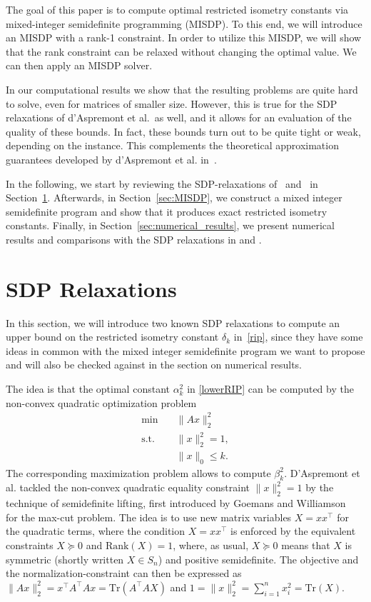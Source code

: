 \documentclass[journal]{IEEEtran}
\newcommand{\Norm}[2]{\lVert{#1}\rVert_{#2}}
\newcommand{\T}{^{\top}}
\newcommand{\Tr}{\text{Tr}}
\newcommand{\Rk}{\text{Rank}}
\begin{document}
The goal of this paper is to compute optimal restricted isometry constants
via mixed-integer semidefinite programming (MISDP). To this end, we will
introduce an MISDP with a rank-1 constraint. In order to utilize this
MISDP, we will show that the rank constraint can be relaxed without
changing the optimal value. We can then apply an MISDP solver.

In our computational results we show that the resulting problems are quite
hard to solve, even for matrices of smaller size. However, this is true for
the SDP relaxations of d'Aspremont et al.\ as well, and it allows for an
evaluation of the quality of these bounds.  In fact, these bounds turn out
to be quite tight or weak, depending on the instance. This complements the
theoretical approximation guarantees developed by d'Aspremont et
al. in~\cite{AspBG14}.

In the following, we start by reviewing the SDP-relaxations of~\cite{Asp08}
and~\cite{Asp07} in Section~\ref{sec:SDPrelax}.  Afterwards, in
Section~\ref{sec:MISDP}, we construct a mixed integer semidefinite
program and show that it produces exact restricted isometry
constants. Finally, in Section~\ref{sec:numerical_results}, we present
numerical results and comparisons with the SDP relaxations in \cite{Asp08}
and \cite{Asp07}.


\section{SDP Relaxations}
\label{sec:SDPrelax}

\noindent
In this section, we will introduce two known SDP relaxations to compute an upper bound on the restricted isometry constant $\delta_k$ in~\eqref{rip}, since they have some ideas in common with the mixed integer semidefinite program we want to 
propose and will also be checked against in the section on numerical
results.

The idea is that the optimal constant $\alpha_k^2$ in \eqref{lowerRIP} can be computed
by the non-convex quadratic optimization problem
\begin{equation}\label{QP}\tag{QP}
 \begin{aligned}
  \min \quad & \Norm{Ax}{2}^2  \\
  \text{s.t.} \quad & \Norm{x}{2}^2 = 1,  \\
  & \Norm{x}{0} \leq k. 
 \end{aligned}
\end{equation}
The corresponding maximization problem allows to compute $\beta_k^2$. D'Aspremont et al. \cite{Asp07} tackled the non-convex quadratic equality constraint 
$\Norm{x}{2}^2 = 1$ by the technique of semidefinite lifting, first introduced by Goemans and Williamson~\cite{GW95} 
for the max-cut problem. The idea is to use new matrix variables $X=xx\T$ for the quadratic terms, where the condition $X=xx\T$ is enforced by the equivalent constraints $X \succeq 0$ and $\Rk(X) = 1$, where, as usual, 
$X \succeq 0$ means that $X$ is symmetric (shortly written $X \in S_n$) and positive semidefinite. The objective and the normalization-constraint can then be expressed as  $\Norm{Ax}{2}^2 = x\T A\T Ax =
\Tr(A\T A X)$ and $1 = \Norm{x}{2}^2 = \sum_{i=1}^n x_i^2 = \Tr(X)$. 
\end{document}
